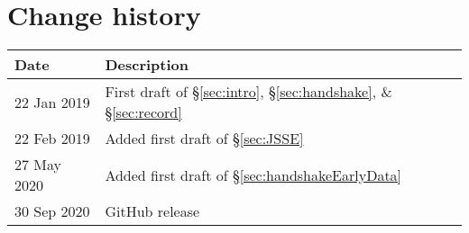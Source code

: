 \section*{Change history}


\begin{tabular}{l|l}
Date        & Description \\ \hline
22 Jan 2019 & First draft of \S\ref{sec:intro}, \S\ref{sec:handshake}, \& \S\ref{sec:record}    \\
22 Feb 2019 & Added first draft of \S\ref{sec:JSSE}                                             \\
27 May 2020 & Added first draft of \S\ref{sec:handshakeEarlyData}                               \\
30 Sep 2020 & GitHub release                                                                    
\end{tabular}

